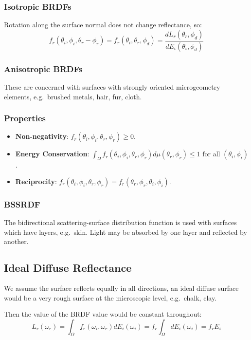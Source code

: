 \documentclass[11pt]{article}
\begin{document}
\subsubsection{Isotropic BRDFs}
Rotation along the surface normal does not change reflectance, so:
\[
  f_r(\theta_i, \phi_i, \theta_r - \phi_r) = f_r(\theta_i, \theta_r, \phi_d) = \frac{dL_r (\theta_r, \phi_d)}{dE_i (\theta_i, \phi_d)}  
\]

\subsubsection{Anisotropic BRDFs}
These are concerned with surfaces with strongly oriented microgeometry elements, e.g.\ brushed metals, hair, fur, cloth.

\subsubsection{Properties}
\begin{itemize}
  \item \textbf{Non-negativity}: $f_r(\theta_i, \phi_i, \theta_r, \phi_r) \geq 0$.
  \item \textbf{Energy Conservation}: $\int_\Omega f_r(\theta_i, \phi_i, \theta_r, \phi_r) d\mu(\theta_r, \phi_r) \leq 1 \text{ for all } (\theta_i, \phi_i)$.
  \item \textbf{Reciprocity}: $f_r(\theta_i, \phi_i, \theta_r, \phi_r) = f_r(\theta_r, \phi_r, \theta_i, \phi_i)$.
\end{itemize}

\subsubsection{BSSRDF}
The bidirectional scattering-surface distribution function is used with surfaces which have layers, e.g.\ skin.
Light may be absorbed by one layer and reflected by another.

\subsection{Ideal Diffuse Reflectance}
We assume the surface reflects equally in all directions, an ideal diffuse surface would be a very rough surface at the microscopic level, e.g.\ chalk, clay.

Then the value of the BRDF value would be constant throughout:
\[
  L_r(\omega_r) = \int_\Omega f_r(\omega_i, \omega_r) dE_i(\omega_i) = f_r \int_\Omega dE_i(\omega_i) = f_r E_i
\]
\end{document}
